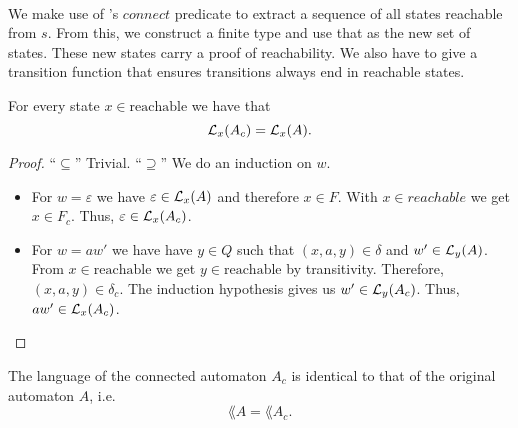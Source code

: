\paragraph{}
We make use of \ssreflect's $connect$ predicate to extract a sequence of all states reachable from $s$. 
From this, we construct a finite type and use that as the new set of states. 
These new states carry a proof of reachability. %
We also have to give a transition function that ensures transitions always end in reachable states.



\begin{lemma}
    \label{dfa_connected_correct'}
    For every state $x \in \mathrm{reachable}$ we have that
    \begin{equation*}
        \mathcal{L}_{x}(A_c) = \mathcal{L}_{x}(A).
    \end{equation*}
\end{lemma}
\begin{proof}
    ``$\subseteq$'' Trivial.
    ``$\supseteq$''
    We do an induction on $w$.
    \begin{itemize}
        \item
            For $w = \varepsilon$ we have $\varepsilon \in \mathcal{L}_{x}(A)$ and therefore $x \in F$. 
            With $x \in reachable$ we get $x \in F_c$. 
            Thus, $\varepsilon \in \mathcal{L}_{x}(A_c)$.
        \item
            For $w = a w'$ we have have $y \in Q$ such that $(x, a, y) \in \delta$ and $w' \in \mathcal{L}_{y}(A)$.
            From $x \in \mathrm{reachable}$ we get $y \in \mathrm{reachable}$ by transitivity.
            Therefore, $(x,a,y) \in \delta_c$.
            The induction hypothesis gives us $w' \in \mathcal{L}_{y}(A_c)$. 
            Thus, $a w' \in \mathcal{L}_{x}(A_c)$.
    \end{itemize}
\end{proof}

\begin{theorem}
    \label{dfa_connected_correct}
    The language of the connected automaton $A_c$ is identical to that of the original automaton $A$, i.e.
    \begin{equation*}
        \lang{A} = \lang{A_c}.        
    \end{equation*}
\end{theorem}

